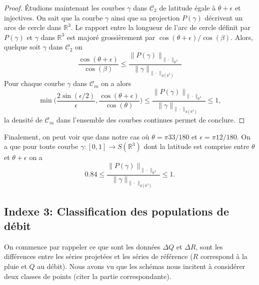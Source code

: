 \documentclass[a4paper,11pt]{article}
\begin{document}
\begin{proof}
Étudions maintenant les courbes $\gamma$ dans $\mathcal{C}_2$ de latitude égale à $\theta+\epsilon$ et injectives. On sait que la courbe $\gamma$ ainsi que sa projection $P(\gamma)$ décrivent un arcs de cercle dans $\mathbb{R}^3$. Le rapport entre la longueur de l'arc de cercle définit par $P(\gamma)$ et $\gamma$ dans $\mathbb{R}^3$ est majoré grossièrement par $\cos(\theta+\epsilon)/\cos(\beta)$. Alors, quelque soit $\gamma$ dans $\mathcal{C}_2$ on
\[\frac{\cos(\theta+\epsilon)}{\cos(\beta)}\leq\frac{\|P(\gamma)\|_{\|\cdot\|_{\mathbb{R}^2}}}{\|\gamma\|_{\|\cdot\|_{S(\mathbb{R}^3)}}}\]
Pour chaque courbe $\gamma$ dans $\mathcal{C}_m$ on a alors 
\[\min\Big(\frac{2\sin(\epsilon/2)}{\epsilon},\frac{\cos(\theta+\epsilon)}{\cos(\theta)} \Big)\leq \frac{\|P(\gamma)\|_{\|\cdot\|_{\mathbb{R}^2}}}{\|\gamma\|_{\|\cdot\|_{S(\mathbb{R}^3)}}} \leq 1,\]
la densité de $\mathcal{C}_m$ dans l'ensemble des courbes continues permet de conclure.
\end{proof}

Finalement, on peut voir que dans notre cas où $\theta=\pi 33/180$ et $\epsilon=\pi 12/180$. On a que pour toute courbe $\gamma:[0,1]\to S(\mathbb{R}^3)$ dont la latitude est comprise entre $\theta$ et $\theta+\epsilon$ on a
\[0.84\leq \frac{\|P(\gamma)\|_{\|\cdot\|_{\mathbb{R}^2}}}{\|\gamma\|_{\|\cdot\|_{S(\mathbb{R}^3)}}} \leq 1.\]

\subsection{Indexe 3: Classification des populations de débit}
\label{indexe3:cl_deb}

On commence par rappeler ce que sont les données $\Delta Q$ et $\Delta R$, sont les différences entre les séries projetées et les séries de référence ($R$ correspond à la pluie et $Q$ au débit). Nous avons vu  que les schémas nous incitent à considérer deux classes de points (citer la partie correspondante).
\end{document}
